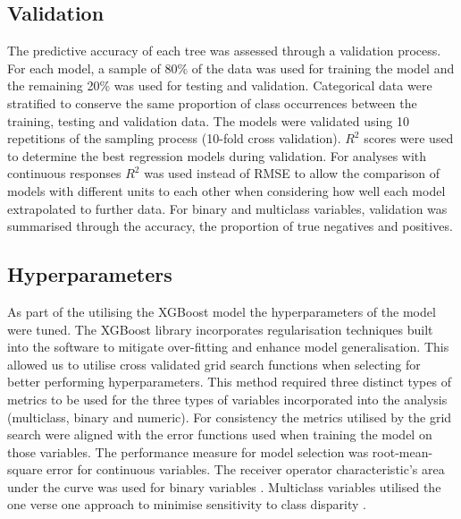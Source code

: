 \documentclass[review,12pt,authoryear]{elsarticle}
\begin{document}
\begin{linenumbers}
\subsection{Validation}

The predictive accuracy of each tree was assessed through a validation process. For each model, a sample of 80\% of the data was used for training the model and the remaining 20\% was used for testing and validation. Categorical data were stratified to conserve the same proportion of class occurrences between the training, testing and validation data. The models were validated using 10 repetitions of the sampling process (10-fold cross validation). $R^2$ scores were used to determine the best regression models during validation. For analyses with continuous responses $R^2$ was used instead of RMSE to allow the comparison of  models with different units to each other when considering how well each model extrapolated to further data. For binary and multiclass variables, validation was summarised through the accuracy, the proportion of true negatives and positives.

\subsection{Hyperparameters}

As part of the utilising the XGBoost model the hyperparameters of the model were tuned. The XGBoost library incorporates regularisation techniques built into the software to mitigate over-fitting and enhance model generalisation. This allowed us to utilise cross validated grid search functions when selecting for better performing hyperparameters. This method required three distinct types of metrics to be used for the three types of variables incorporated into the analysis (multiclass, binary and numeric). For consistency the metrics utilised by the grid search were aligned with the error functions used when training the model on those variables. The performance measure for model selection was root-mean-square error for continuous variables. The receiver operator characteristic's area under the curve was used for binary variables \citep{hanley1982meaning}. Multiclass variables utilised the one verse one approach to minimise sensitivity to class disparity \citep{ferriExperimentalComparisonPerformance2009,handSimpleGeneralisationArea2001}.



\end{linenumbers}
\end{document}
